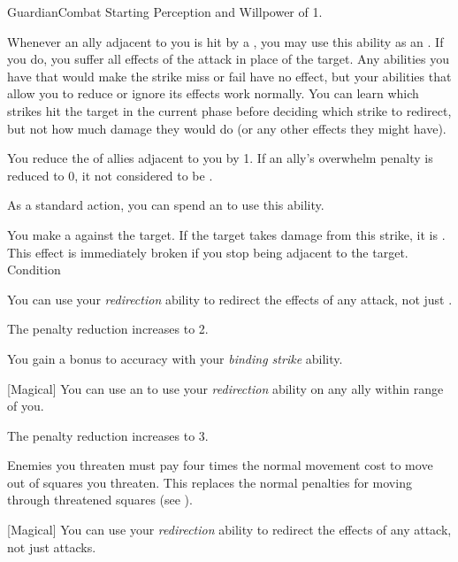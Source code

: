     \begin{feat}{Guardian}{Combat}
        \featpre Starting Perception and Willpower of 1.
        \featben

         Whenever an ally adjacent to you is hit by a , you may use this ability as an .
        If you do, you suffer all effects of the attack in place of the target.
        Any abilities you have that would make the strike miss or fail have no effect, but your abilities that allow you to reduce or ignore its effects work normally.
        You can learn which strikes hit the target in the current phase before deciding which strike to redirect, but not how much damage they would do (or any other effects they might have).

         You reduce the  of allies adjacent to you by 1.
        If an ally's overwhelm penalty is reduced to 0, it not considered to be .

         As a standard action, you can spend an  to use this ability.
        \begin{ability}
            \begin{spelltargetinginfo}
            \end{spelltargetinginfo}
            \begin{spelleffects}
                \spelleffect You make a  against the target.
                If the target takes damage from this strike, it is \immobilized.
                This effect is immediately broken if you stop being adjacent to the target.
                \spelldur Condition
            \end{spelleffects}
        \end{ability}

         You can use your \textit{redirection} ability to redirect the effects of any  attack, not just .

         The penalty reduction increases to 2.

         You gain a  bonus to accuracy with your \textit{binding strike} ability.

        [Magical] You can use an  to use your \textit{redirection} ability on any ally within \rnglong range of you.

         The penalty reduction increases to 3.

         Enemies you threaten must pay four times the normal movement cost to move out of squares you threaten.
        This replaces the normal penalties for moving through threatened squares (see ).

        [Magical] You can use your \textit{redirection} ability to redirect the effects of any attack, not just  attacks. 
    \end{feat}

